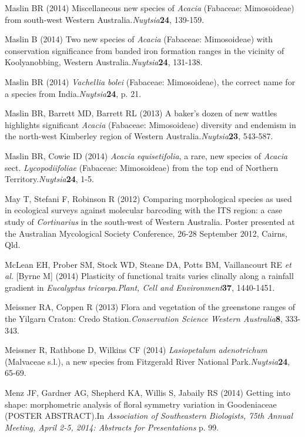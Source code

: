 \documentclass[version=last, paper=a4, DIV=18, usenames, dvipsnames]{scrartcl}
\begin{document}
Maslin BR (2014) Miscellaneous new species of \emph{Acacia} (Fabaceae: Mimosoideae) from south-west Western Australia.\emph{Nuytsia}\textbf{24}, 139-159.


Maslin B (2014) Two new species of \emph{Acacia} (Fabaceae: Mimosoideae) with conservation significance from banded iron formation ranges in the vicinity of Koolyanobbing, Western Australia.\emph{Nuytsia}\textbf{24}, 131-138.


Maslin BR (2014) \emph{Vachellia} \emph{bolei} (Fabaceae: Mimosoideae), the correct name for a species from India.\emph{Nuytsia}\textbf{24}, p. 21.


Maslin BR, Barrett MD, Barrett RL (2013) A baker's dozen of new wattles highlights significant \emph{Acacia} (Fabaceae: Mimosoideae) diversity and endemism in the north-west Kimberley region of Western Australia.\emph{Nuytsia}\textbf{23}, 543-587.


Maslin BR, Cowie ID (2014) \emph{Acacia} \emph{equisetifolia}, a rare, new species of \emph{Acacia} sect. \emph{Lycopodiifoliae} (Fabaceae: Mimosoideae) from the top end of Northern Territory.\emph{Nuytsia}\textbf{24}, 1-5.


May T, Stefani F, Robinson R (2012) Comparing morphological species as used in ecological surveys against molecular barcoding with the ITS region: a case study of \emph{Cortinarius} in the south-west of Western Australia. Poster presented at the Australian Mycological Society Conference, 26-28 September 2012, Cairns, Qld.


McLean EH, Prober SM, Stock WD, Steane DA, Potts BM, Vaillancourt RE \emph{et al.} [Byrne M] (2014) Plasticity of functional traits varies clinally along a rainfall gradient in \emph{Eucalyptus} \emph{tricarpa}.\emph{Plant, Cell and Environment}\textbf{37}, 1440-1451.


Meissner RA, Coppen R (2013) Flora and vegetation of the greenstone ranges of the Yilgarn Craton: Credo Station.\emph{Conservation Science Western Australia}\textbf{8}, 333-343.


Meissner R, Rathbone D, Wilkins CF (2014) \emph{Lasiopetalum} \emph{adenotrichum} (Malvaceae s.l.), a new species from Fitzgerald River National Park.\emph{Nuytsia}\textbf{24}, 65-69.


Menz JF, Gardner AG, Shepherd KA, Willis S, Jabaily RS (2014) Getting into shape: morphometric analysis of floral symmetry variation in Goodeniaceae (POSTER ABSTRACT).In \emph{Association of Southeastern Biologists, 75th Annual Meeting, April 2-5, 2014: Abstracts for Presentations} p. 99.
\end{document}
